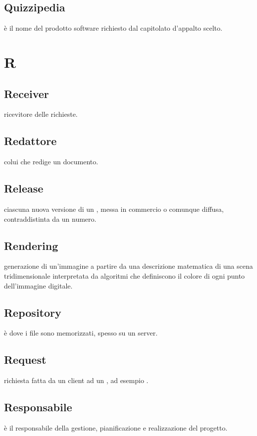 \documentclass[12pt,a4paper]{article}
\begin{document}
\subsection{Quizzipedia} 
 è il nome del prodotto software richiesto dal capitolato d'appalto scelto.


\newpage

\section{R}


	
\subsection{Receiver} 
ricevitore delle richieste.	
	
\subsection{Redattore} 
colui che redige un documento.

\subsection{Release} 
ciascuna nuova versione di un , messa in commercio o comunque diffusa, contraddistinta da un numero.

\subsection{Rendering} 
generazione di un'immagine a partire da una descrizione matematica di una scena tridimensionale interpretata da algoritmi che definiscono il colore di ogni punto dell'immagine digitale.

\subsection{Repository} 
è dove i file sono memorizzati, spesso su un server.

\subsection{Request} 
richiesta fatta da un client ad un , ad esempio .

\subsection{Responsabile} 
è il responsabile della gestione, pianificazione e realizzazione del progetto.
\end{document}

